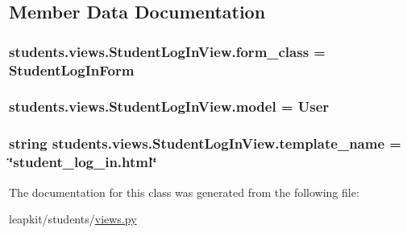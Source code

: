 \subsection{Member Data Documentation}
\hypertarget{classstudents_1_1views_1_1_student_log_in_view_a3e3e16f553aee428f087b669da95ada0}{
\subsubsection[{form\-\_\-class}]{\setlength{\rightskip}{0pt plus 5cm}students.\-views.\-Student\-Log\-In\-View.\-form\-\_\-class = Student\-Log\-In\-Form\hspace{0.3cm}{\ttfamily [static]}}}\label{classstudents_1_1views_1_1_student_log_in_view_a3e3e16f553aee428f087b669da95ada0}
\hypertarget{classstudents_1_1views_1_1_student_log_in_view_a5acd7d5724d7a6cbc0963424420c4f5e}{
\subsubsection[{model}]{\setlength{\rightskip}{0pt plus 5cm}students.\-views.\-Student\-Log\-In\-View.\-model = User\hspace{0.3cm}{\ttfamily [static]}}}\label{classstudents_1_1views_1_1_student_log_in_view_a5acd7d5724d7a6cbc0963424420c4f5e}
\hypertarget{classstudents_1_1views_1_1_student_log_in_view_a6c533a74b8b7c2eab25e8e357aed18be}{
\subsubsection[{template\-\_\-name}]{\setlength{\rightskip}{0pt plus 5cm}string students.\-views.\-Student\-Log\-In\-View.\-template\-\_\-name = \char`\"{}student\-\_\-log\-\_\-in.\-html\char`\"{}\hspace{0.3cm}{\ttfamily [static]}}}\label{classstudents_1_1views_1_1_student_log_in_view_a6c533a74b8b7c2eab25e8e357aed18be}


The documentation for this class was generated from the following file\-:\begin{DoxyCompactItemize}
\item 
leapkit/students/\hyperlink{views_8py}{views.\-py}\end{DoxyCompactItemize}
